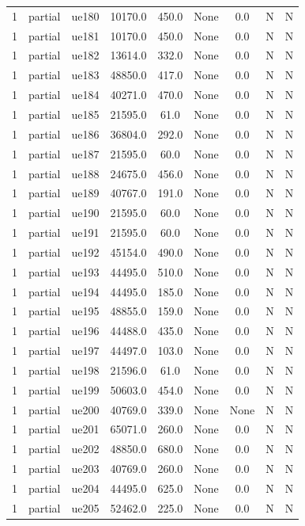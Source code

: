 \begin{table}[ht]
\begin{tabular}{|c|c|c|c|c|c|c|c|c|}
1 & partial & ue180 & 10170.0 & 450.0 & None & 0.0 & N & N \\
1 & partial & ue181 & 10170.0 & 450.0 & None & 0.0 & N & N \\
1 & partial & ue182 & 13614.0 & 332.0 & None & 0.0 & N & N \\
1 & partial & ue183 & 48850.0 & 417.0 & None & 0.0 & N & N \\
1 & partial & ue184 & 40271.0 & 470.0 & None & 0.0 & N & N \\
1 & partial & ue185 & 21595.0 & 61.0 & None & 0.0 & N & N \\
1 & partial & ue186 & 36804.0 & 292.0 & None & 0.0 & N & N \\
1 & partial & ue187 & 21595.0 & 60.0 & None & 0.0 & N & N \\
1 & partial & ue188 & 24675.0 & 456.0 & None & 0.0 & N & N \\
1 & partial & ue189 & 40767.0 & 191.0 & None & 0.0 & N & N \\
1 & partial & ue190 & 21595.0 & 60.0 & None & 0.0 & N & N \\
1 & partial & ue191 & 21595.0 & 60.0 & None & 0.0 & N & N \\
1 & partial & ue192 & 45154.0 & 490.0 & None & 0.0 & N & N \\
1 & partial & ue193 & 44495.0 & 510.0 & None & 0.0 & N & N \\
1 & partial & ue194 & 44495.0 & 185.0 & None & 0.0 & N & N \\
1 & partial & ue195 & 48855.0 & 159.0 & None & 0.0 & N & N \\
1 & partial & ue196 & 44488.0 & 435.0 & None & 0.0 & N & N \\
1 & partial & ue197 & 44497.0 & 103.0 & None & 0.0 & N & N \\
1 & partial & ue198 & 21596.0 & 61.0 & None & 0.0 & N & N \\
1 & partial & ue199 & 50603.0 & 454.0 & None & 0.0 & N & N \\
1 & partial & ue200 & 40769.0 & 339.0 & None & None & N & N \\
1 & partial & ue201 & 65071.0 & 260.0 & None & 0.0 & N & N \\
1 & partial & ue202 & 48850.0 & 680.0 & None & 0.0 & N & N \\
1 & partial & ue203 & 40769.0 & 260.0 & None & 0.0 & N & N \\
1 & partial & ue204 & 44495.0 & 625.0 & None & 0.0 & N & N \\
1 & partial & ue205 & 52462.0 & 225.0 & None & 0.0 & N & N \\

\end{tabular}
\end{table}
